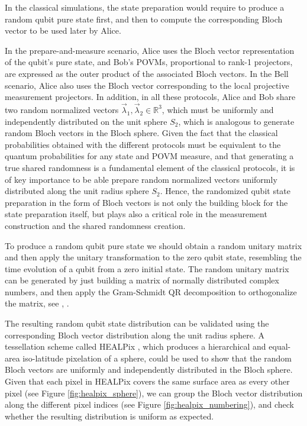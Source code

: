 In the classical simulations, the state preparation would require to produce a random qubit pure state first, and then to compute the corresponding Bloch vector to be used later by Alice. 

In the prepare-and-measure scenario, Alice uses the Bloch vector representation of the qubit's pure state, and Bob's POVMs,  proportional to rank-1 projectors, are expressed as the outer product of the associated Bloch vectors. In the Bell scenario, Alice also uses the Bloch vector corresponding to the local projective measurement projectors. In addition, in all these protocols, Alice and Bob share two random normalized vectors $\vec{\lambda}_1, \vec{\lambda}_2 \in \mathbb{R}^{3}$, which must be uniformly and independently distributed on the unit sphere $S_2$, which is analogous to generate random Bloch vectors in the Bloch sphere. Given the fact that the classical probabilities obtained with the different protocols must be equivalent to the quantum probabilities for any state and POVM measure, and that generating a true shared randomness is a fundamental element of the classical protocols, it is of key importance to be able prepare random normalized vectors uniformly distributed along the unit radius sphere $S_2$. Hence, the randomized qubit state preparation in the form of Bloch vectors is not only the building block for the state preparation itself, but plays also a critical role in the measurement construction and the shared randomness creation.

To produce a random qubit pure state we should obtain a random unitary matrix and then apply the unitary transformation to the zero qubit state, resembling the time evolution of a qubit from a zero initial state. The random unitary matrix can be generated by just building a matrix of normally distributed complex numbers, and then apply the Gram-Schmidt QR decomposition to orthogonalize the matrix, see \cite{ozols2009}, \cite{zyczkowski1994}. 

The resulting random qubit state distribution can be validated using the corresponding Bloch vector distribution along the unit radius sphere. A tessellation scheme called HEALPix \cite{healpix}, which produces a hierarchical and equal-area iso-latitude pixelation of a sphere, could be used to show that the random Bloch vectors are uniformly and independently distributed in the Bloch sphere. Given that each pixel in HEALPix covers the same surface area as every other pixel (see Figure \ref{fig:healpix_sphere}), we can group the Bloch vector distribution along the different pixel indices (see Figure \ref{fig:healpix_numbering}), and check whether the resulting distribution is uniform as expected.

